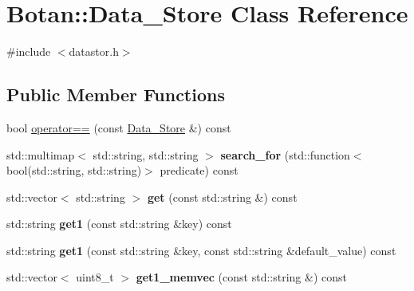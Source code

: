 \hypertarget{class_botan_1_1_data___store}{}\section{Botan\+:\+:Data\+\_\+\+Store Class Reference}
\label{class_botan_1_1_data___store}


{\ttfamily \#include $<$datastor.\+h$>$}

\subsection*{Public Member Functions}
\begin{DoxyCompactItemize}
\item 
bool \mbox{\hyperlink{class_botan_1_1_data___store_a8c889aa5cbadc64821c72e77f3a6a19c}{operator==}} (const \mbox{\hyperlink{class_botan_1_1_data___store}{Data\+\_\+\+Store}} \&) const
\item 
\mbox{\label{class_botan_1_1_data___store_a1d01a50a8f286a4597309825d319e358}} 
std\+::multimap$<$ std\+::string, std\+::string $>$ {\bfseries search\+\_\+for} (std\+::function$<$ bool(std\+::string, std\+::string)$>$ predicate) const
\item 
\mbox{\label{class_botan_1_1_data___store_a942208a90c15d86db395542201ae7970}} 
std\+::vector$<$ std\+::string $>$ {\bfseries get} (const std\+::string \&) const
\item 
\mbox{\label{class_botan_1_1_data___store_aca669033de873b643cf1e96c9948db1b}} 
std\+::string {\bfseries get1} (const std\+::string \&key) const
\item 
\mbox{\label{class_botan_1_1_data___store_a7dca4cdf6f18b8e681232965aaeccc09}} 
std\+::string {\bfseries get1} (const std\+::string \&key, const std\+::string \&default\+\_\+value) const
\item 
\mbox{\label{class_botan_1_1_data___store_a7ab73fd00d4499ccaf45f38ecd8b13bd}} 
std\+::vector$<$ uint8\+\_\+t $>$ {\bfseries get1\+\_\+memvec} (const std\+::string \&) const
\item 
\mbox{\label{class_botan_1_1_data___store_a0434c97f8d94f7a804bf36bda9c165d9}} 

\end{DoxyCompactItemize}
